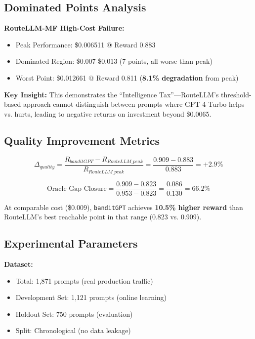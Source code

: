 \subsection*{Dominated Points Analysis}

\textbf{RouteLLM-MF High-Cost Failure:}
\begin{itemize}
    \item Peak Performance: \$0.006511 @ Reward 0.883
    \item Dominated Region: \$0.007{-}\$0.013 (7 points, all worse than peak)
    \item Worst Point: \$0.012661 @ Reward 0.811 (\textbf{8.1\% degradation} from peak)
\end{itemize}

\textbf{Key Insight:} This demonstrates the ``Intelligence Tax''---RouteLLM's threshold-based approach cannot distinguish between prompts where GPT-4-Turbo helps vs. hurts, leading to negative returns on investment beyond \$0.0065.

\subsection*{Quality Improvement Metrics}

\begin{equation}
\Delta_{quality} = \frac{R_{banditGPT} - R_{RouteLLM\_peak}}{R_{RouteLLM\_peak}} = \frac{0.909 - 0.883}{0.883} = +2.9\%
\end{equation}

\begin{equation}
\text{Oracle Gap Closure} = \frac{0.909 - 0.823}{0.953 - 0.823} = \frac{0.086}{0.130} = 66.2\%
\end{equation}

At comparable cost (\$0.009), \texttt{banditGPT} achieves \textbf{10.5\% higher reward} than RouteLLM's best reachable point in that range (0.823 vs. 0.909).

\subsection*{Experimental Parameters}

\textbf{Dataset:}
\begin{itemize}
    \item Total: 1,871 prompts (real production traffic)
    \item Development Set: 1,121 prompts (online learning)
    \item Holdout Set: 750 prompts (evaluation)
    \item Split: Chronological (no data leakage)
\end{itemize}

